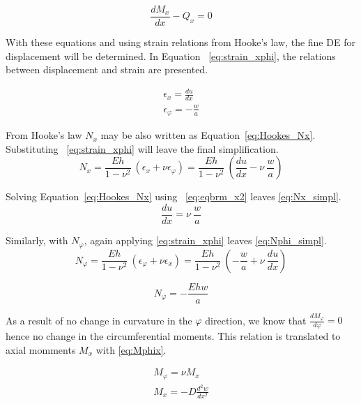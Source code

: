 \begin{equation}
	\label{eq:eqbrm_y2}
	\frac{dM_x}{dx}- Q_x= 0
\end{equation} 

With these equations and using strain relations from Hooke's law, the fine DE for displacement will be determined. In Equation ~\ref{eq:strain_xphi}, the relations between displacement and strain are presented.

\begin{equation}
	\label{eq:strain_xphi}
	\begin{aligned}
		\epsilon_x = \frac{du}{dx}      \\
		\epsilon_\varphi = -\frac{w}{a} 
	\end{aligned}
\end{equation}

From Hooke's law $N_x$ may be also written as Equation~\ref{eq:Hookes_Nx}. Substituting ~\ref{eq:strain_xphi} will leave the final simplification.
\begin{equation}
	\label{eq:Hookes_Nx}
	N_x = \frac{Eh}{1-\nu^2}\ \left( \epsilon_x + \nu \epsilon_\varphi \right) =  \frac{Eh}{1-\nu^2}\ \left( \frac{du}{dx} -\nu \ \frac{w}{a} \right)
\end{equation} 

Solving Equation~\ref{eq:Hookes_Nx} using ~\ref{eq:eqbrm_x2} leaves \ref{eq:Nx_simpl}.
\begin{equation}
	\label{eq:Nx_simpl}
	\frac{du}{dx} =  \nu \ \frac{w}{a}
\end{equation} 

Similarly, with $N_\varphi$, again applying \ref{eq:strain_xphi} leaves \ref{eq:Nphi_simpl}.
\begin{equation}
	\label{eq:Hookes_Nphi}
	N_\varphi = \frac{Eh}{1-\nu^2}\ \left( \epsilon_\varphi + \nu \epsilon_x \right) = \frac{Eh}{1-\nu^2}\  \left( -\frac{w}{a}+\nu \ \frac{du}{dx} \right)
\end{equation} 

\begin{equation}
	\label{eq:Nphi_simpl}
	N_\varphi = - \frac{Ehw}{a}
\end{equation}

As a result of no change in curvature in the $\varphi$ direction, we know that $\frac{dM_\varphi}{d\varphi}= 0$ hence no change in the circumferential moments. This relation is translated to axial momments $M_x$ with \ref{eq:Mphix}.

\begin{equation}
	\label{eq:Mphix}
	\begin{aligned}
		M_\varphi = \nu M_x        \\
		M_x = -D \frac{d^2w}{dx^2} 
	\end{aligned}
\end{equation}

